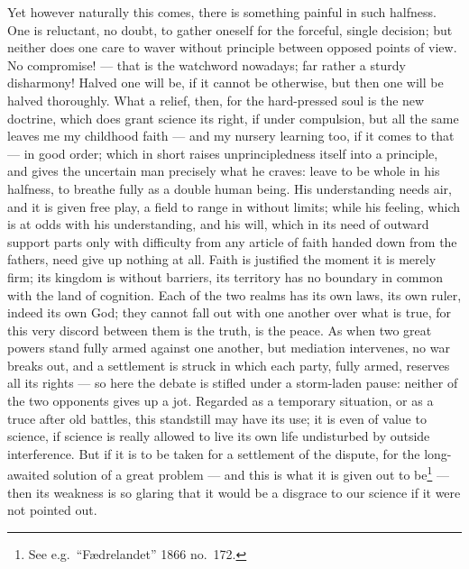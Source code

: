 \documentclass[12pt,a4paper]{book}
\renewcommand{\thefootnote}{*)}
\newcommand{\fnmark}[2]{\renewcommand{\thefootnote}{#1}\footnote{#2}%
  \renewcommand{\thefootnote}{*)}}
\newcommand{\opage}[1]{\marginnote{\footnotesize\textit{[#1]}}}
\begin{document}
Yet however naturally this comes, there is something painful in such halfness.
One is reluctant, no doubt, to gather oneself for the forceful, single
decision; but neither does one care to waver without principle between opposed
points of view. No compromise! --- that is the watchword nowadays; far rather a
sturdy disharmony! Halved one will be, if it cannot be otherwise, but then
\opage{14}one will be halved thoroughly. What a relief, then, for the hard-pressed
soul is the new doctrine, which does grant science its right, if under
compulsion, but all the same leaves me my childhood faith --- and my nursery
learning too, if it comes to that --- in good order; which in short raises
unprincipledness itself into a principle, and gives the uncertain man precisely
what he craves: leave to be whole in his halfness, to breathe fully as a double
human being. His understanding needs air, and it is given free play, a field to
range in without limits; while his feeling, which is at odds with his
understanding, and his will, which in its need of outward support parts only
with difficulty from any article of faith handed down from the fathers, need
give up nothing at all. Faith is justified the moment it is merely firm; its
kingdom is without barriers, its territory has no boundary in common with the
land of cognition. Each of the two realms has its own laws, its own ruler,
indeed its own God; they cannot fall out with one another over what is true,
for this very discord between them is
the truth, is the peace. As when two great powers stand fully armed against one
another, but mediation intervenes, no war breaks out, and a settlement is
struck in which each party, fully armed, reserves all its rights --- so here
the debate is stifled under a storm-laden pause: neither of the two opponents
gives up a jot. Regarded as a temporary situation, or as a truce after old
battles, this standstill may have its use; it is even of value to
\opage{15}science, if science is really allowed to live its own life
undisturbed by outside interference. But if it is to be taken for a settlement
of the dispute, for the long-awaited solution of a great problem --- and this
is what it is given out to be\fnmark{*)}{See e.g.\ ``Fædrelandet'' 1866 no.\
172.} --- then its weakness is so glaring that it would be a disgrace to our
science if it were not pointed out.
\end{document}
